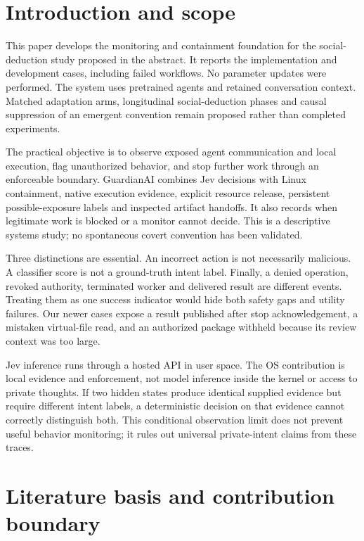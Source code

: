 \documentclass[conference]{IEEEtran}
\begin{document}
\section{Introduction and scope}\label{introduction-and-scope}

This paper develops the monitoring and containment foundation for the social-deduction study proposed in the abstract. It reports the implementation and development cases, including failed workflows. No parameter updates were performed. The system uses pretrained agents and retained conversation context. Matched adaptation arms, longitudinal social-deduction phases and causal suppression of an emergent convention remain proposed rather than completed experiments.

The practical objective is to observe exposed agent communication and local execution, flag unauthorized behavior, and stop further work through an enforceable boundary. GuardianAI combines Jev decisions with Linux containment, native execution evidence, explicit resource release, persistent possible-exposure labels and inspected artifact handoffs. It also records when legitimate work is blocked or a monitor cannot decide. This is a descriptive systems study; no spontaneous covert convention has been validated.

Three distinctions are essential. An incorrect action is not necessarily malicious. A classifier score is not a ground-truth intent label. Finally, a denied operation, revoked authority, terminated worker and delivered result are different events. Treating them as one success indicator would hide both safety gaps and utility failures. Our newer cases expose a result published after stop acknowledgement, a mistaken virtual-file read, and an authorized package withheld because its review context was too large.

Jev inference runs through a hosted API in user space. The OS contribution is local evidence and enforcement, not model inference inside the kernel or access to private thoughts. If two hidden states produce identical supplied evidence but require different intent labels, a deterministic decision on that evidence cannot correctly distinguish both. This conditional observation limit does not prevent useful behavior monitoring; it rules out universal private-intent claims from these traces.

\section{Literature basis and contribution boundary}\label{literature-basis-and-contribution-boundary}
\end{document}
